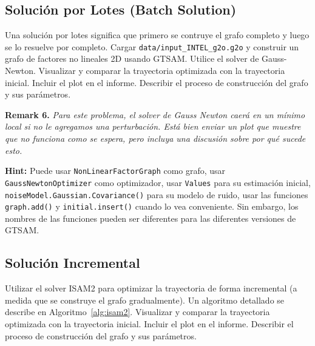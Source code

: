 \documentclass[tp]{lcc}
\begin{document}
\subsection{Solución por Lotes (Batch Solution)}
Una solución por lotes significa que primero se contruye el grafo completo y luego se lo resuelve por completo. Cargar \lstinline[style=bash]{data/input_INTEL_g2o.g2o} y construir un grafo de factores no lineales 2D usando GTSAM. Utilice el solver de Gauss-Newton. Visualizar y comparar la trayectoria optimizada con la trayectoria inicial. Incluir el plot en el informe. Describir el proceso de construcción del grafo y sus parámetros.

\textbf{Remark 6.} \textit{Para este problema, el solver de Gauss Newton caerá en un mínimo local si no le agregamos una perturbación. Está bien enviar un plot que muestre que no funciona como se espera, pero incluya una discusión sobre por qué sucede esto.}

\textbf{Hint:} Puede usar \lstinline[style=bash]{NonLinearFactorGraph} como grafo, usar \lstinline[style=bash]{GaussNewtonOptimizer} como optimizador, usar \lstinline[style=bash]{Values} para su estimación inicial, \lstinline[style=bash]{noiseModel.Gaussian.Covariance()} para su modelo de ruido, usar las funciones \lstinline[style=bash]{graph.add()} y \lstinline[style=bash]{initial.insert()} cuando lo vea conveniente. Sin embargo, los nombres de las funciones pueden ser diferentes para las diferentes versiones de GTSAM.

\subsection{Solución Incremental}
\label{sec:incremental_solution}
Utilizar el solver ISAM2 para optimizar la trayectoria de forma incremental (a medida que se construye el grafo gradualmente). Un algoritmo detallado se describe en Algoritmo~\ref{alg:isam2}. Visualizar y comparar la trayectoria optimizada con la trayectoria inicial. Incluir el plot en el informe. Describir el proceso de construcción del grafo y sus parámetros.
\end{document}
